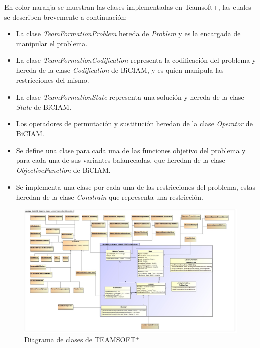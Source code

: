 En color naranja se muestran las clases implementadas en Teamsoft+, las cuales se describen brevemente a continuación:
\begin{itemize}
	\item La clase \textit{TeamFormationProblem} hereda de \textit{Problem} y es la encargada de manipular el problema.
	\item La clase \textit{TeamFormationCodification} representa la codificación del problema y hereda de la clase \textit{Codification} de BiCIAM, y es quien manipula las restricciones del mismo.
	\item La clase \textit{TeamFormationState} representa una solución y hereda de la clase \textit{State} de BiCIAM.
	\item Los operadores de permutación y sustitución heredan de la clase \textit{Operator} de BiCIAM.
	\item Se define una clase para cada una de las funciones objetivo del problema y para cada una de sus variantes balanceadas, que heredan de la clase \textit{ObjectiveFunction} de BiCIAM.
	\item Se implementa una clase por cada una de las restricciones del problema, estas heredan de la clase \textit{Constrain} que representa una restricción.
\end{itemize}

\newpage
{}
\recalctypearea
	\begin{figure}[H]
\hspace{-3.2cm}
		\includegraphics[width=1.3\textwidth]{figuras/diagrama-clases-teamsoft.jpg}
		\caption{Diagrama de clases de TEAMSOFT$^+$}\label{fig:diag-clases}
	\end{figure}
\newpage
{}
\recalctypearea

